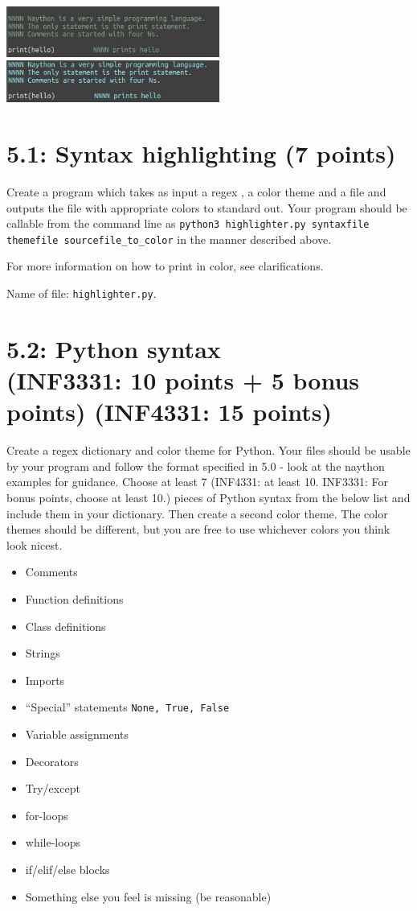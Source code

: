 \documentclass[english]{article}
\begin{document}
\begin{center}
  \includegraphics[width=7cm]{naython_colored_1}
  \includegraphics[width=7cm]{naython_colored_2}
\end{center}



\section{5.1: Syntax highlighting (7 points)}
Create a program which takes as input a regex , a color theme and a file and outputs the file with appropriate colors to standard out. Your program should be callable from the command line as \texttt{python3 highlighter.py syntaxfile themefile sourcefile\_to\_color} in the manner described above.

For more information on how to print in color, see clarifications.

Name of file: \texttt{highlighter.py}.


\section{5.2: Python syntax \\ (INF3331: 10 points + 5 bonus points) (INF4331: 15 points)}
Create a regex dictionary and color theme for Python. Your files should be usable by your program and follow the format specified in 5.0 - look at the naython examples for guidance. Choose at least 7 (INF4331: at least 10. INF3331: For bonus points, choose at least 10.) pieces of Python syntax from the below list and include them in your dictionary. Then create a second color theme. The color themes should be different, but you are free to use whichever colors you think look nicest.


\begin{itemize}
\item Comments
\item Function definitions
\item Class definitions
\item Strings
\item Imports
\item ``Special'' statements \texttt{None, True, False}
\item Variable assignments
\item Decorators
\item Try/except
\item for-loops
\item while-loops
\item if/elif/else blocks
\item Something else you feel is missing (be reasonable)

\end{itemize}
\end{document}
